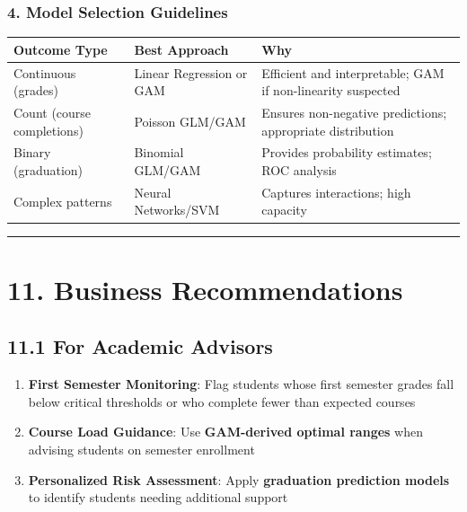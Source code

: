 \documentclass[
]{article}
\newcounter{none} %
\providecommand{\tightlist}{%
  \setlength{\itemsep}{0pt}\setlength{\parskip}{0pt}}
\begin{document}
\subsubsection{4. Model Selection
Guidelines}\label{model-selection-guidelines}

{\def\LTcaptype{none} %
\begin{longtable}[]{@{}
  >{\raggedright\arraybackslash}p{}
  >{\raggedright\arraybackslash}p{}
  >{\raggedright\arraybackslash}p{}@{}}
\toprule\noalign{}
\begin{minipage}[b]{\linewidth}\raggedright
Outcome Type
\end{minipage} & \begin{minipage}[b]{\linewidth}\raggedright
Best Approach
\end{minipage} & \begin{minipage}[b]{\linewidth}\raggedright
Why
\end{minipage} \\
\midrule\noalign{}
\endhead
\bottomrule\noalign{}
\endlastfoot
Continuous (grades) & Linear Regression or GAM & Efficient and
interpretable; GAM if non-linearity suspected \\
Count (course completions) & Poisson GLM/GAM & Ensures non-negative
predictions; appropriate distribution \\
Binary (graduation) & Binomial GLM/GAM & Provides probability estimates;
ROC analysis \\
Complex patterns & Neural Networks/SVM & Captures interactions; high
capacity \\
\end{longtable}
}

\begin{center}\rule{0.5\linewidth}{0.5pt}\end{center}

\section{11. Business Recommendations}\label{business-recommendations}

\subsection{11.1 For Academic Advisors}\label{for-academic-advisors}

\begin{enumerate}
\def\labelenumi{\arabic{enumi}.}
\tightlist
\item
  \textbf{First Semester Monitoring}: Flag students whose first semester
  grades fall below critical thresholds or who complete fewer than
  expected courses
\item
  \textbf{Course Load Guidance}: Use \textbf{GAM-derived optimal ranges}
  when advising students on semester enrollment
\item
  \textbf{Personalized Risk Assessment}: Apply \textbf{graduation
  prediction models} to identify students needing additional support
\end{enumerate}
\end{document}
